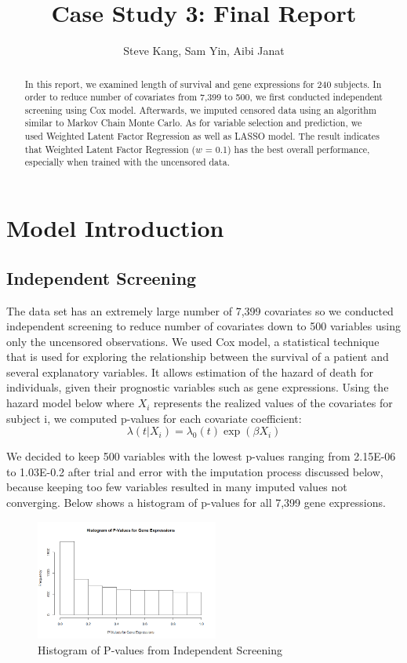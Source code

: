 \documentclass[a4paper]{article}
\title{Case Study 3: Final Report}
\author{Steve Kang, Sam Yin, Aibi Janat}
\begin{document}
\maketitle

\begin{abstract}
In this report, we examined length of survival and gene expressions for 240 subjects. In order to reduce number of covariates from 7,399 to 500, we first conducted independent screening using Cox model. Afterwards, we imputed censored data using an algorithm similar to Markov Chain Monte Carlo. As for variable selection and prediction, we used Weighted Latent Factor Regression as well as LASSO model. The result indicates that Weighted Latent Factor Regression ($w$ = 0.1) has the best overall performance, especially when trained with the uncensored data.
\end{abstract}

\section{Model Introduction}

\subsection{Independent Screening}
The data set has an extremely large number of 7,399 covariates so we conducted independent screening to reduce number of covariates down to 500 variables using only the uncensored observations. We used Cox model, a statistical technique that is used for exploring the relationship between the survival of a patient and several explanatory variables. It allows estimation of the hazard of death for individuals, given their prognostic variables such as gene expressions. Using the hazard model below where $X_{i}$ represents the realized values of the covariates for subject i, we computed p-values for each covariate coefficient:
$$\lambda(t|X_{i}) = \lambda_{0}(t)\exp(\beta X_{i})$$

We decided to keep 500 variables with the lowest p-values ranging from 2.15E-06 to 1.03E-0.2 after trial and error with the imputation process discussed below, because keeping too few variables resulted in many imputed values not converging. Below shows a histogram of p-values for all 7,399 gene expressions.

\begin{figure}[H]
\centering
\includegraphics[width=60mm]{pvalue.png}
\caption{Histogram of P-values from Independent Screening}
\end{figure}
\end{document}

